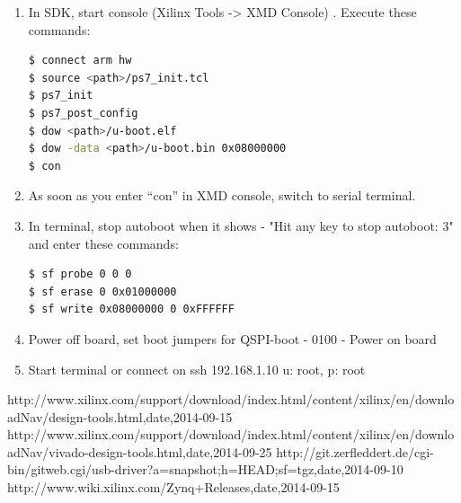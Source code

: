 \begin{enumerate}
\item In SDK, start console (Xilinx Tools -> XMD Console) . Execute these commands:
\begin{lstlisting}[language=bash]
$ connect arm hw 
$ source <path>/ps7_init.tcl 
$ ps7_init 
$ ps7_post_config  
$ dow <path>/u-boot.elf 
$ dow -data <path>/u-boot.bin 0x08000000 
$ con 
\end{lstlisting}
\item As soon as you enter “con” in XMD console, switch to serial terminal. 
\item In terminal, stop autoboot when it shows - "Hit any key to stop autoboot: 3" and enter these commands: 
\begin{lstlisting}[language=bash]
$ sf probe 0 0 0 
$ sf erase 0 0x01000000 
$ sf write 0x08000000 0 0xFFFFFF 
\end{lstlisting}
\item Power off board, set boot jumpers for QSPI-boot - 0100 - Power on board \newline
\item Start terminal or connect on ssh 192.168.1.10 u: root, p: root
\end{enumerate}
\begin{thebibliography}{99}
http://www.xilinx.com/support/download/index.html/content/xilinx/en/downloadNav/design-tools.html,date,2014-09-15  
http://www.xilinx.com/support/download/index.html/content/xilinx/en/downloadNav/vivado-design-tools.html,date,2014-09-25 
http://git.zerfleddert.de/cgi-bin/gitweb.cgi/usb-driver?a=snapshot;h=HEAD;sf=tgz,date,2014-09-10
http://www.wiki.xilinx.com/Zynq+Releases,date,2014-09-15 
\end{thebibliography}